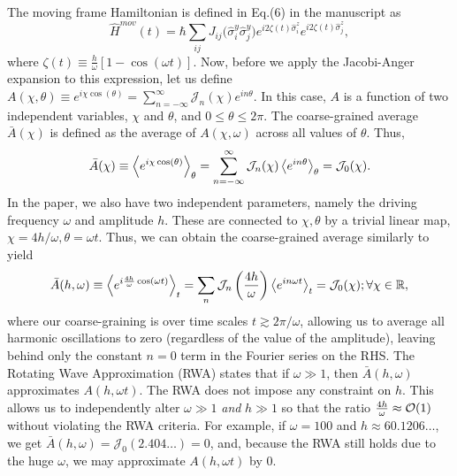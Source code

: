 \documentclass[aps,prb,reprint,showpacs,floatfix,superscriptaddress, onecolumn, nofootinbib, 9pt]{revtex4-2}
\begin{document}
\begin{enumerate}
{The moving frame Hamiltonian is defined in Eq.(6) in the manuscript as
\begin{equation}
    \hat{H}^{mov}(t) = \hbar\sum_{ij} J_{ij} \Big(\hat{\sigma}^y_i\hat{\sigma}^y_j\Big) e^{i 2\zeta(t)\hat{\sigma}^z_i}  e^{i 2\zeta(t) \hat{\sigma}^z_j},
    \label{eq:hmov}
\end{equation}
where $\zeta(t)\equiv \frac{h}{\omega}[1-\cos(\omega t)]$. Now, before we apply the Jacobi-Anger expansion to this expression, let us define $ A(\chi,\theta)\equiv\displaystyle e^{i\chi \cos(\theta)} = \sum_{n=-\infty}^{\infty} \mathcal{J}_n(\chi)e^{in\theta} $. In this case, $A$ is a function of two independent variables, $\chi$ and $\theta$, and $0\leq\theta\leq 2\pi$. The coarse-grained average $\bar{A}(\chi)$ is defined as the average of $A(\chi, \omega)$ across all values of $\theta$. Thus,
\begin{equation}
\bar{A}(\chi) \equiv \expval{e^{i\chi\cos(\theta)}}_{\theta} = \sum_{n=-\infty}^{\infty} \mathcal{J}_n(\chi) \expval{e^{in\theta}}_{\theta} =\mathcal{J}_0(\chi).
\end{equation}
In the paper, we also have two independent parameters, namely the driving frequency $\omega$ and amplitude $h$. These are connected to $\chi, \theta$ by a trivial linear map, $\chi=4h/\omega, \theta=\omega t$. Thus, we can obtain the coarse-grained average similarly to yield
\begin{equation}
    \bar{A}(h,\omega) \equiv \expval{e^{i\frac{4h}{\omega}\cos(\omega t)}}_t = \sum_n\mathcal{J}_n\left(\frac{4h}{\omega}\right)\expval{e^{i n \omega t}}_t = \mathcal{J}_0(\chi) ;  \forall{\chi}\in\mathbb{R},
    \label{eq:jacang}
\end{equation}
where our coarse-graining is over time scales $t\gtrsim 2\pi/\omega$, allowing us to average all harmonic oscillations to zero (regardless of the value of the amplitude), leaving behind only the constant $n=0$ term in the Fourier series on the RHS. The Rotating Wave Approximation (RWA) states that if $\omega \gg 1$, then  $\bar{A}(h,\omega)$ approximates $A(h, \omega t)$. The RWA does not impose any constraint on $h$.
This allows us to independently alter $\omega \gg 1$ \emph{and} $h \gg 1$ so that the ratio $\frac{4h}{\omega} \approx \order{1}$ without violating the RWA criteria. For example, if $\omega=100$ and $h\approx 60.1206\dots$, we get $\bar{A}(h,\omega)=\mathcal{J}_0(2.404\dots)=0$, and, because the RWA still holds due to the huge $\omega$, we may approximate $A(h,\omega t)$ by $0$.

}
\end{enumerate}
\end{document}
